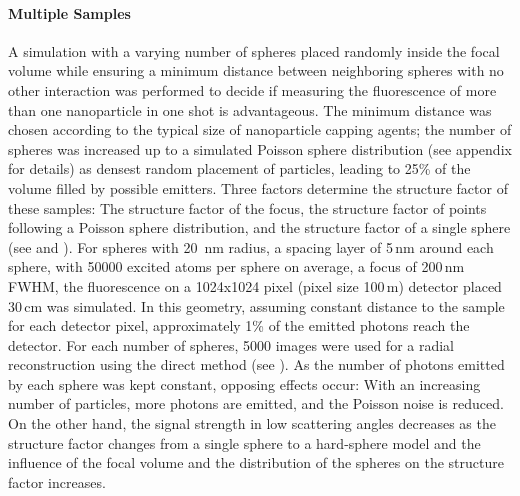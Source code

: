 



\paragraph{Multiple Samples}

A simulation with a varying number of spheres placed randomly inside the focal volume while ensuring a minimum distance between neighboring spheres with no other interaction was performed to decide if measuring the fluorescence of more than one nanoparticle in one shot is advantageous.
The minimum distance was chosen according to the typical size of nanoparticle capping agents; the number of spheres was increased up to a simulated Poisson sphere distribution (see appendix  for details) as densest random placement of particles, leading to 25\% of the volume filled by possible emitters.
Three factors determine the structure factor of these samples: The structure factor of the focus, the structure factor of points following a Poisson sphere distribution, and the structure factor of a single sphere (see  and ). 
For spheres with 20\, nm radius, a spacing layer of 5\,nm around each sphere, with  50000 excited atoms per sphere on average, a focus of 200\,nm FWHM, the fluorescence on a 1024x1024 pixel (pixel size 100\,\textmu m) detector placed 30\,cm was simulated. In this geometry, assuming constant distance to the sample for each detector pixel, approximately 1\% of the emitted photons reach the detector.  For each number of spheres, 5000 images were used for a radial reconstruction using the direct method (see ).
As the number of photons emitted by each sphere was kept constant, opposing effects occur:  With an increasing number of particles, more photons are emitted, and the Poisson noise is reduced. On the other hand, the signal strength in low scattering angles decreases as the structure factor changes from a single sphere to a hard-sphere model and the influence of the focal volume and the distribution of the spheres on the structure factor increases. 

